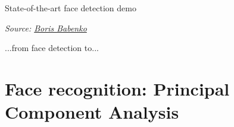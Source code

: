\documentclass[compress]{beamer}
\newcommand{\source}[2]{{\tiny\it Source: \href{#1}{#2}}}
\begin{document}
\begin{frame}{State-of-the-art face detection demo}

    \begin{center}

        \source{http://vision.ucsd.edu/~bbabenko/}{Boris Babenko}
    \end{center}

\end{frame}



\begin{frame}[plain]
    \begin{center}
        ...from face detection to...
    \end{center}
\end{frame}

\section[Principal Component Analysis]{Face recognition: Principal Component Analysis}

\end{document}
